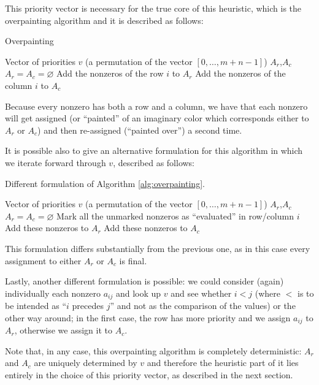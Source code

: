 This priority vector is necessary for the true core of this heuristic, which is the overpainting algorithm and it is described  as follows:

\begin{algorithm}[H]
\caption{Overpainting} \label{alg:overpainting}
\begin{algorithmic}
\STATE
\REQUIRE Vector of priorities $v$ (a permutation of the vector $[0,\dots,m+n-1]$)
\ENSURE $A_r$,$A_c$
\STATE
\STATE $A_r = A_c = \varnothing$
\STATE Add the nonzeros of the row $i$ to $A_r$
\ELSE
\STATE Add the nonzeros of the column $i$ to $A_c$
\ENDIF
\ENDFOR
\end{algorithmic}
\end{algorithm}

Because every nonzero has both a row and a column, we have that each nonzero will get assigned (or ``painted'' of an imaginary color which corresponds either to $A_r$ or $A_c$) and then re-assigned (``painted over'') a second time.

It is possible also to give an alternative formulation for this algorithm in which we iterate forward through $v$, described as follows:

\begin{algorithm}[H]
\caption{Different formulation of Algorithm \ref{alg:overpainting}.} \label{alg:overpainting-2}
\begin{algorithmic}
\STATE
\REQUIRE Vector of priorities $v$ (a permutation of the vector $[0,\dots,m+n-1]$)
\ENSURE $A_r$,$A_c$
\STATE 
\STATE $A_r = A_c = \varnothing$
\STATE Mark all the unmarked nonzeros as ``evaluated'' in row/column $i$
\STATE Add these nonzeros to $A_r$
\ELSE
\STATE Add these nonzeros to $A_c$
\ENDIF
\ENDFOR
\end{algorithmic}
\end{algorithm}

This formulation differs substantially from the previous one, as in this case every assignment to either $A_r$ or $A_c$ is final.

Lastly, another different formulation is possible:  we could consider (again) individually each nonzero $a_{ij}$ and look up $v$ and see whether $i < j$ (where $<$ is to be intended as ``$i$ precedes $j$'' and not as the comparison of the values) or the other way around; in the first case, the row has more priority and we assign $a_{ij}$ to $A_r$, otherwise we assign it to $A_c$.

Note that, in any case, this overpainting algorithm is completely deterministic: $A_r$ and $A_c$ are uniquely determined by $v$ and therefore the heuristic part of it lies entirely in the choice of this priority vector, as described in the next section.

